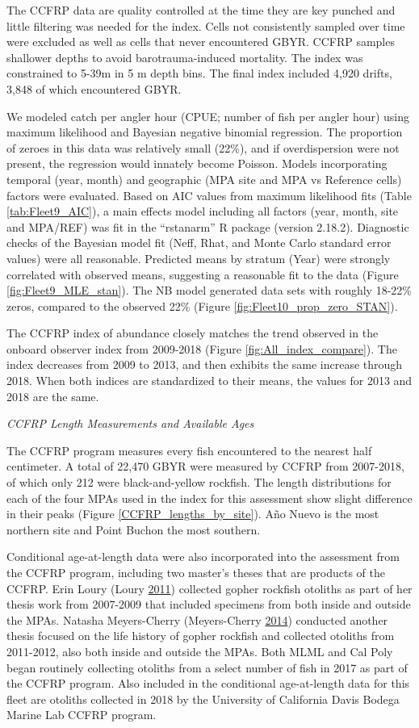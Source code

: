 \documentclass[12pt,]{article}
\begin{document}
The CCFRP data are quality controlled at the time they are key punched
and little filtering was needed for the index. Cells not consistently
sampled over time were excluded as well as cells that never encountered
GBYR. CCFRP samples shallower depths to avoid barotrauma-induced
mortality. The index was constrained to 5-39m in 5 m depth bins. The
final index included 4,920 drifts, 3,848 of which encountered GBYR.

We modeled catch per angler hour (CPUE; number of fish per angler hour)
using maximum likelihood and Bayesian negative binomial regression. The
proportion of zeroes in this data was relatively small (22\%), and if
overdispersion were not present, the regression would innately become
Poisson. Models incorporating temporal (year, month) and geographic (MPA
site and MPA vs Reference cells) factors were evaluated. Based on AIC
values from maximum likelihood fits (Table \ref{tab:Fleet9_AIC}), a main
effects model including all factors (year, month, site and MPA/REF) was
fit in the ``rstanarm'' R package (version 2.18.2). Diagnostic checks of
the Bayesian model fit (Neff, Rhat, and Monte Carlo standard error
values) were all reasonable. Predicted means by stratum (Year) were
strongly correlated with observed means, suggesting a reasonable fit to
the data (Figure \ref{fig:Fleet9_MLE_stan}). The NB model generated data
sets with roughly 18-22\% zeros, compared to the observed 22\% (Figure
\ref{fig:Fleet10_prop_zero_STAN}).

The CCFRP index of abundance closely matches the trend observed in the
onboard observer index from 2009-2018 (Figure
\ref{fig:All_index_compare}). The index decreases from 2009 to 2013, and
then exhibits the same increase through 2018. When both indices are
standardized to their means, the values for 2013 and 2018 are the same.

\emph{CCFRP Length Measurements and Available Ages}

The CCFRP program measures every fish encountered to the nearest half
centimeter. A total of 22,470 GBYR were measured by CCFRP from
2007-2018, of which only 212 were black-and-yellow rockfish. The length
distributions for each of the four MPAs used in the index for this
assessment show slight difference in their peaks (Figure
\ref{CCFRP_lengths_by_site}). Año Nuevo is the most northern site and
Point Buchon the most southern.

Conditional age-at-length data were also incorporated into the
assessment from the CCFRP program, including two master's theses that
are products of the CCFRP. Erin Loury (Loury
\protect\hyperlink{ref-Loury2011}{2011}) collected gopher rockfish
otoliths as part of her thesis work from 2007-2009 that included
specimens from both inside and outside the MPAs. Natasha Meyers-Cherry
(Meyers-Cherry \protect\hyperlink{ref-MeyersCherry2014}{2014}) conducted
another thesis focused on the life history of gopher rockfish and
collected otoliths from 2011-2012, also both inside and outside the
MPAs. Both MLML and Cal Poly began routinely collecting otoliths from a
select number of fish in 2017 as part of the CCFRP program. Also
included in the conditional age-at-length data for this fleet are
otoliths collected in 2018 by the University of California Davis Bodega
Marine Lab CCFRP program.
\end{document}
